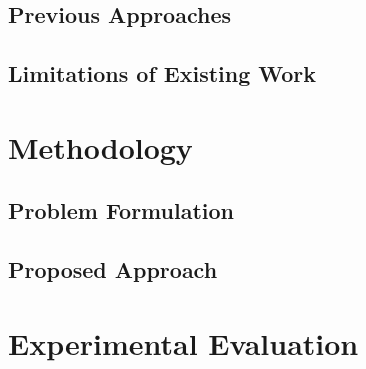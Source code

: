 \documentclass[11pt,a4paper]{article}
\begin{document}

\subsection{Previous Approaches}
\label{subsec:previous_approaches}


\subsection{Limitations of Existing Work}
\label{subsec:limitations}


\section{Methodology}
\label{sec:methodology}


\subsection{Problem Formulation}
\label{subsec:formulation}


\subsection{Proposed Approach}
\label{subsec:approach}


\section{Experimental Evaluation}
\label{sec:experiments}
\end{document}
